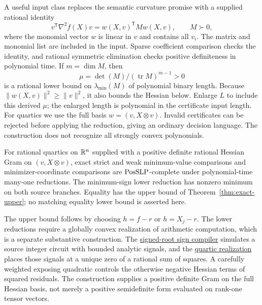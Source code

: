 A useful input class replaces the semantic curvature promise with a
supplied rational identity
\begin{equation}
 v^{\mathsf T}\nabla^2f(X)v
 =w(X,v)^{\mathsf T}Mw(X,v),\qquad M\succ0,
 \label{eq:full-hessian-certificate}
\end{equation}
where the monomial vector $w$ is linear in $v$ and contains all
$v_i$. The matrix and monomial list are included in the input.
Sparse coefficient comparison checks the identity, and rational
symmetric elimination checks positive definiteness in polynomial
time. If $m=\dim M$, then
\[
 \mu=\det(M)/(\operatorname{tr}M)^{m-1}>0
\]
is a rational lower bound on $\lambda_{\min}(M)$ of polynomial
binary length. Because $\|w(X,v)\|^2\ge\|v\|^2$, it also
bounds the Hessian below. Enlarge $L$ to include this derived $\mu$;
the enlarged length is polynomial in the certificate input length.
For quartics we use the full basis
$w=(v,X\otimes v)$. Invalid certificates can be rejected before
applying the reduction, giving an ordinary decision language. The
construction does not recognize all strongly convex polynomials.

\begin{theorem}
\label{thm:quartic-exact-complete}
For rational quartics on $\mathbb R^n$ supplied with a positive definite
rational Hessian Gram on $(v,X\otimes v)$, exact strict and weak
minimum-value comparisons and minimizer-coordinate comparisons are
$\mathrm{PosSLP}$-complete under polynomial-time many-one reductions.
The minimum-sign lower reduction has nonzero minimum on both source
branches. Equality has the upper bound of
Theorem~\ref{thm:exact-upper}; no matching equality lower bound is
asserted here.
\end{theorem}

The upper bound follows by choosing $h=f-r$ or $h=X_j-r$.
The lower reductions require a globally convex realization of
arithmetic computation, which is a separate substantive construction.
The
\href{../../research-20260927/posslp-certified-cubic-root-reduction.md}{signed-root sign compiler}
simulates a source integer circuit with bounded analytic signals,
and the
\href{../../research-20260927/signed-odd-root-circuit-quartic.md}{quartic realization}
places those signals at a unique zero of a rational sum of squares.
A carefully weighted exposing quadratic controls the otherwise
negative Hessian terms of squared residuals. The construction supplies
a positive definite Gram on the full Hessian basis, not merely a
positive semidefinite form evaluated on rank-one tensor vectors.

